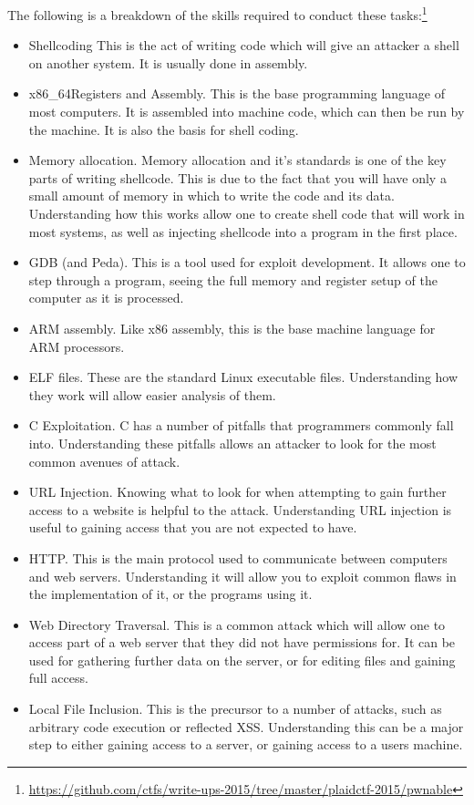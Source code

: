 \documentclass[a4paper,11pt]{report}
\begin{document}
			The following is a breakdown of the skills required to conduct these tasks:\footnote{\url{https://github.com/ctfs/write-ups-2015/tree/master/plaidctf-2015/pwnable}}
			\begin{itemize}
				\item Shellcoding
					This is the act of writing code which will give an attacker a shell on another system. 
					It is usually done in assembly. 
				\item x86\_64Registers and Assembly. 
					This is the base programming language of most computers. 
					It is assembled into machine code, which can then be run by the machine. 
					It is also the basis for shell coding. 
				\item Memory allocation. 
					Memory allocation and it's standards is one of the key parts of writing shellcode. 
					This is due to the fact that you will have only a small amount of memory in which to write the code and its data. 
					Understanding how this works allow one to create shell code that will work in most systems, as well as injecting shellcode into a program in the first place. 
				\item GDB (and Peda).
					This is a tool used for exploit development. 
					It allows one to step through a program, seeing the full memory and register setup of the computer as it is processed. 
				\item ARM assembly.
					Like x86 assembly, this is the base machine language for ARM processors. 
				\item ELF files.
					These are the standard Linux executable files. 
					Understanding how they work will allow easier analysis of them. 
				\item C Exploitation.
					C has a number of pitfalls that programmers commonly fall into. 
					Understanding these pitfalls allows an attacker to look for the most common avenues of attack. 
				\item URL Injection.
					Knowing what to look for when attempting to gain further access to a website is helpful to the attack. 
					Understanding URL injection is useful to gaining access that you are not expected to have. 
				\item HTTP. 
					This is the main protocol used to communicate between computers and web servers. 
					Understanding it will allow you to exploit common flaws in the implementation of it, or the programs using it. 
				\item Web Directory Traversal. 
					This is a common attack which will allow one to access part of a web server that they did not have permissions for. 
					It can be used for gathering further data on the server, or for editing files and gaining full access. 
				\item Local File Inclusion.
					This is the precursor to a number of attacks, such as arbitrary code execution or reflected XSS. 
					Understanding this can be a major step to either gaining access to a server, or gaining access to a users machine. 
			\end{itemize}
\end{document}
